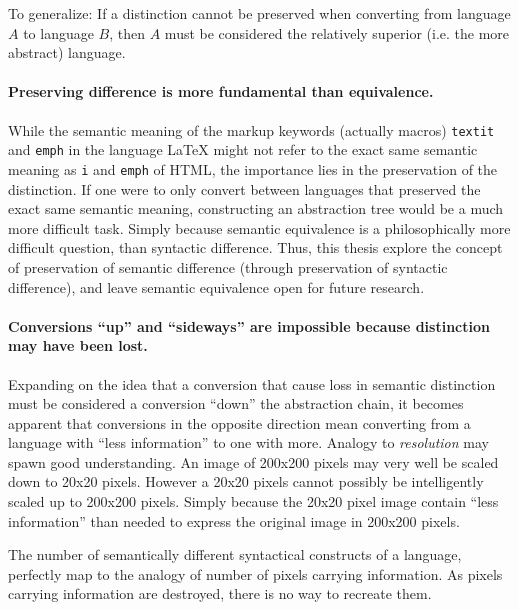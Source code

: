 \documentclass{scrreprt}
\begin{document}
To generalize: If a distinction cannot be preserved when converting from language $A$ to language $B$, then $A$ must be considered the relatively superior (i.e. the more abstract) language.

\paragraph{Preserving difference is more fundamental than equivalence.} While the semantic meaning of the markup keywords (actually macros) \texttt{textit} and \texttt{emph} in the language \LaTeX{} might not refer to the exact same semantic meaning as \texttt{i} and \texttt{emph} of HTML, the importance lies in the preservation of the distinction. If one were to only convert between languages that preserved the exact same semantic meaning, constructing an abstraction tree would be a much more difficult task. Simply because semantic equivalence is a philosophically more difficult question, than syntactic difference. Thus, this thesis explore the concept of preservation of semantic difference (through preservation of syntactic difference), and leave semantic equivalence open for future research.
\label{sec:difference-is-more-important-than-equivalence}


\paragraph{Conversions ``up'' and ``sideways'' are impossible because distinction may have been lost.} Expanding on the idea that a conversion that cause loss in semantic distinction must be considered a conversion ``down'' the abstraction chain, it becomes apparent that conversions in the opposite direction mean converting from a language with ``less information'' to one with more. Analogy to \emph{resolution} may spawn good understanding. An image of 200x200 pixels may very well be scaled down to 20x20 pixels. However a 20x20 pixels cannot possibly be intelligently scaled up to 200x200 pixels. Simply because the 20x20 pixel image contain ``less information'' than needed to express the original image in 200x200 pixels.

The number of semantically different syntactical constructs of a language, perfectly map to the analogy of number of pixels carrying information. As pixels carrying information are destroyed, there is no way to recreate them.
\end{document}
